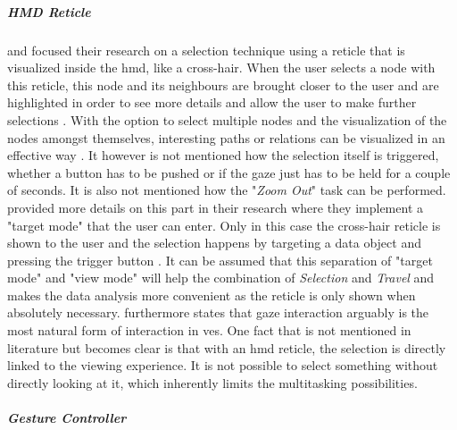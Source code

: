 \subparagraph{HMD Reticle}

\cite{Kwon2015} and \cite{Drouhard2015} focused their research on a selection technique using a reticle that is visualized inside the \gls{hmd}, like a cross-hair. When the user selects a node with this reticle, this node and its neighbours are brought closer to the user and are highlighted in order to see more details and allow the user to make further selections \citep{Kwon2015}. With the option to select multiple nodes and the visualization of the nodes amongst themselves, interesting paths or relations can be visualized in an effective way \citep{Kwon2015}. It however is not mentioned how the selection itself is triggered, whether a button has to be pushed or if the gaze just has to be held for a couple of seconds. It is also not mentioned how the "\textit{Zoom Out}" task can be performed. \newline
\cite{Drouhard2015} provided more details on this part in their research where they implement a "target mode" that the user can enter. Only in this case the cross-hair reticle is shown to the user and the selection happens by targeting a data object and pressing the trigger button \citep{Drouhard2015}. It can be assumed that this separation of "target mode" and "view mode" will help the combination of \textit{Selection} and \textit{Travel} and makes the data analysis more convenient as the reticle is only shown when absolutely necessary. \newline
\cite{Drouhard2015} furthermore states that gaze interaction arguably is the most natural form of interaction in \gls{ve}s. \newline
One fact that is not mentioned in literature but becomes clear is that with an \gls{hmd} reticle, the selection is directly linked to the viewing experience. It is not possible to select something without directly looking at it, which inherently limits the multitasking possibilities.


\subparagraph{Gesture Controller}

\label{HentschelFigureRef}

